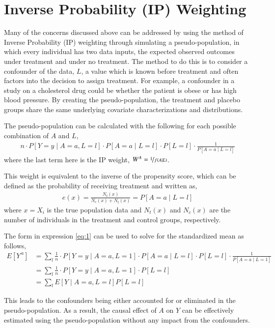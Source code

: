 \section{Inverse Probability (IP) Weighting} \label{IP Weighting} 
Many of the concerns discussed above can be addressed by using the method of Inverse Probability (IP) weighting through simulating a pseudo-population, in which every individual has two data inputs, the expected observed outcomes under treatment and under no treatment.  The method to do this is to consider a confounder of the data, $L$, a value which is known before treatment and often factors into the decision to assign treatment.  For example, a confounder in a study on a cholesterol drug could be whether the patient is obese or has high blood pressure.  By creating the pseudo-population, the treatment and placebo groups share the same underlying covariate characterizations and distributions. 

The pseudo-population can be calculated with the following for each possible combination of $A$ and $L$, 
\begin{align} \label{eq:1}
n\cdot P[Y=y \mid A = a, L= l] \cdot P[A=a \mid L=l]  \cdot P[L=l] \cdot \frac{1}{P[A = a \mid L = l]} \end{align}  
where the last term here is the IP weight, $W^{A} = \nicefrac{1}{f(A\mid L)}$.  

This weight is equivalent to the inverse of the propensity score, which can be defined as the probability of receiving treatment and written as,\cite{imbens2015causal}
\begin{align} 
e(x) = \frac{N_t(x)}{N_c(x) + N_t(x)} = P[A=a \mid L = l] 
\end{align} 
where $x = X_i$ is the true population data and $N_t(x)$ and $N_c (x)$ are the number of individuals in the treatment and control groups, respectively.  

The form in expression \ref{eq:1} can be used to solve for the standardized mean as follows, 
\begin{align} 
E[Y^{\,a}] &= \sum_l \frac{1}{n} \cdot P[Y=y \mid A = a, L= 1] \cdot P[A=a \mid L=l]  \cdot P[L=l] \cdot \frac{1}{P[A = a \mid L = 1]} \\ 
&=  \sum_l \frac{1}{n} \cdot P[Y=y \mid A = a, L= 1] \cdot P[L=l]\\ 
&= \sum_l E[Y \mid A=a, L= l] P[L=l] 
\end{align} 

This leads to the confounders being either accounted for or eliminated in the pseudo-population.  As a result, the causal effect of $A$ on $Y$ can be effectively estimated using the pseudo-population without any impact from the confounders.  

